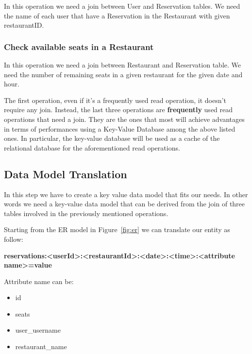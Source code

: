 In this operation we need a join between User and Reservation tables.  We need
the name of each user that have a Reservation in the Restaurant with given
restaurantID.

\subsubsection{Check available seats in a Restaurant}

In this operation we need a join between Restaurant and Reservation table. We
need the number of remaining seats in a given restaurant for the given date and
hour.

The first operation, even if it's a frequently used read operation, it doesn't
require any join.  Instead, the last three operations are \textbf{frequently}
used read operations that need a join. They are the ones that most will achieve
advantages in terms of performances using a Key-Value Database among the above
listed ones. In particular, the key-value database will be used as a cache of
the relational database for the aforementioned read operations.

\subsection{Data Model Translation}

In this step we have to create a key value data model that fits our needs.  In
other words we need a key-value data model that can be derived from the join of
three tables involved in the previously mentioned operations.

Starting from the ER model in Figure~\ref{fig:er} we can translate our entity as
follow:

\vspace{0.75cm}

\centerline{\textbf{reservations:<userId>:<restaurantId>:<date>:<time>:<attribute name>=value}}

\vspace{0.75cm}

Attribute name can be:
\begin{itemize}
	\item id
	\item seats
	\item user\_username
	\item restaurant\_name
\end{itemize}
\vfill

